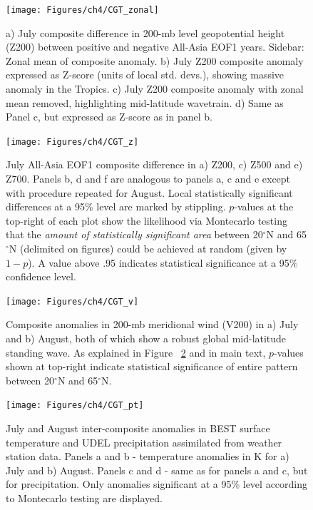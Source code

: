 
\clearpage
\newpage	

\begin{figure}
\centering
\noindent\texttt{[image: Figures/ch4/CGT\_zonal]}
\caption{a) July composite difference in 200-mb level geopotential height (Z200) between positive and negative All-Asia EOF1 years. Sidebar: Zonal mean of composite anomaly. b) July Z200 composite anomaly expressed as Z-score (units of local std. devs.), showing massive anomaly in the Tropics. c) July Z200 composite anomaly with zonal mean removed, highlighting mid-latitude wavetrain. d) Same as Panel c, but expressed as Z-score as in panel b.}
\label{fig:cgt_zonal}
\end{figure}

\begin{figure}
\centering
\noindent\texttt{[image: Figures/ch4/CGT\_z]}
\caption{July All-Asia EOF1 composite difference in a) Z200, c) Z500 and e) Z700. Panels b, d and f are analogous to panels a, c and e except with procedure repeated for August. Local statistically significant differences at a 95\% level are marked by stippling. $p$-values at the top-right of each plot show the likelihood via Montecarlo testing that the \textit{amount of statistically significant area} between 20$^{\circ}$N and 65$^{\circ}$N (delimited on figures) could be achieved at random (given by $1-p$). A value above .95 indicates statistical significance at a 95\% confidence level.}
\label{fig:cgt_z}
\end{figure}

\begin{figure}
\centering
\noindent\texttt{[image: Figures/ch4/CGT\_v]}
\caption{Composite anomalies in 200-mb meridional wind (V200) in a) July and b) August, both of which show a robust global mid-latitude standing wave. As explained in Figure ~\ref{fig:cgt_z} and in main text, $p$-values shown at top-right indicate statistical significance of entire pattern between 20$^{\circ}$N and 65$^{\circ}$N.}
\label{fig:cgt_v}
\end{figure}

\begin{figure}
\centering
\noindent\texttt{[image: Figures/ch4/CGT\_pt]}
\caption{July and August inter-composite anomalies in BEST surface temperature and UDEL precipitation assimilated from weather station data. Panels a and b - temperature anomalies in K for a) July and b) August. Panels c and d - same as for panels a and c, but for precipitation. Only anomalies significant at a 95\% level according to Montecarlo testing are displayed.}
\label{fig:cgt_pt}
\end{figure}

